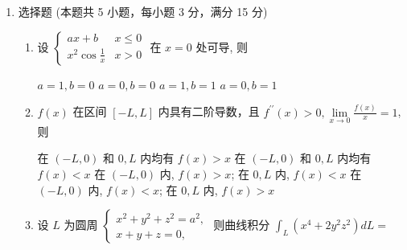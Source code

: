 \begin{enumerate}
{\begin{enumerate}
		\item
		$dz=-\frac{y+z}{x+y}\,dx-\frac{x+z}{x+y}\,dy$。
		对隐式方程 $yz+zx+xy=1$ 取全微分：
		\[
		(z+y)\,dx+(z+x)\,dy+(x+y)\,dz=0,
		\]
		当 $x+y\ne0$ 时即解出上式。

		\item
		$0<p<2$。令 $t=1/x$，则 $x=1/t$、$dx=-dt/t^2$，从而
		\[
		\int_0^{+\infty}\frac{\sin(1/x)}{x^p}\,dx
		=\int_0^{+\infty}t^{p-2}\sin t\,dt.
		\]
		在 $t\to0^{+}$ 时 $\sin t\sim t$，被积函数等价于
		$t^{p-1}$，故要求 $p>0$；在 $t\to+\infty$ 时，
		由 Dirichlet 判别法，$t^{p-2}\sin t$ 的积分收敛需要
		$p-2<0$，即 $p<2$（$p=2$ 时 $\int^{+\infty}\sin t\,dt$ 发散）。
		所以收敛域为 $0<p<2$；进一步，$0<p<1$ 时绝对收敛，
		$1\leqslant p<2$ 时条件收敛。

		\item
		$y=(C_1+C_2x)e^{-2x}+\frac19e^x$。齐次方程的特征方程为
		\[
		r^2+4r+4=(r+2)^2=0,
		\]
		有二重根 $-2$，故 $y_h=(C_1+C_2x)e^{-2x}$。
		因 $1$ 不是特征根，对非齐次项设 $y^{*}=Ae^x$，代入得
		\[
		(A+4A+4A)e^x=e^x,
		\]
		所以 $A=\frac19$。
	\end{enumerate}
}

\item 	
选择题 (本题共 5 小题，每小题 3 分，满分 15 分)	
\begin{enumerate}
	\item
	设 $\left\{\begin{array}{ll}a x+b & x \leqslant 0 \\ x^{2} \cos \frac{1}{x} & x>0\end{array}\right.$ 在 $x=0$ 处可导, 则 

	
\fourchoices
{$a=1, b=0$}
{$a=0, b=0$}
{$a=1, b=1$}
{$a=0, b=1$}

	
\item 
	$f(x)$ 在区间 $[-L, L]$ 内具有二阶导数，且 $f^{\prime \prime}(x)>0, \lim\limits _{x \rightarrow 0} \frac{f(x)}{x}=1$, 则 


\fourchoices
{在 $(-L, 0)$ 和 $0, L$ 内均有 $f(x)>x$}
{在 $(-L, 0)$ 和 $0, L$ 内均有 $f(x)<x$}
{在 $(-L, 0)$ 内, $f(x)>x$; 在 $0, L$ 内, $f(x)<x$}
{在 $(-L, 0)$ 内, $f(x)<x$; 在 $0, L$ 内, $f(x)>x$}



\item
	设 $L$ 为圆周
	$\left\{\begin{array}{l}
	x^{2}+y^{2}+z^{2}=a^{2},\\
	x+y+z=0,
	\end{array}\right.$
	则曲线积分 $\int_{L}\left(x^{4}+2 y^{2} z^{2}\right) d L=$ 



\end{enumerate}
\end{enumerate}
